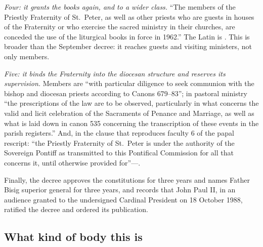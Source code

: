 \emph{Four: it grants the books again, and to a wider class.} ``The
members of the Priestly Fraternity of St.\ Peter, as well as other priests
who are guests in houses of the Fraternity or who exercise the sacred
ministry in their churches, are conceded the use of the liturgical books
in force in 1962.'' The Latin is . This is broader than the
September decree: it reaches guests and visiting ministers, not only
members.

\emph{Five: it binds the Fraternity into the diocesan structure and
reserves its supervision.} Members are ``with particular diligence to
seek communion with the bishop and diocesan priests according to Canons
679--83''; in pastoral ministry ``the prescriptions of the law are to be
observed, particularly in what concerns the valid and licit celebration
of the Sacraments of Penance and Marriage, as well as what is laid down
in canon 535 concerning the transcription of these events in the parish
registers.'' And, in the clause that reproduces faculty 6 of the papal
rescript: ``the Priestly Fraternity of St.\ Peter is under the authority
of the Sovereign Pontiff as transmitted to this Pontifical Commission for
all that concerns it, until otherwise provided for''---.

Finally, the decree approves the constitutions for three years and names
Father Bisig superior general for three years, and records that John Paul
II, in an audience granted to the undersigned Cardinal President on 18
October 1988, ratified the decree and ordered its publication.

\subsection{What kind of body this is}

